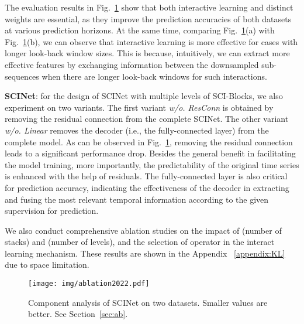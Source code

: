 \documentclass{article}
\begin{document}
The evaluation results in Fig.~\ref{fig:ab} show that both interactive learning and distinct weights are essential, as they improve the prediction accuracies of both datasets at various prediction horizons. At the same time, comparing Fig.~\ref{fig:ab}(a) with Fig.~\ref{fig:ab}(b), we can observe that interactive learning is more effective for cases with longer look-back window sizes. This is because, intuitively, we can extract more effective features by exchanging information between the downsampled sub-sequences when there are longer look-back windows for such interactions.


\vspace{5pt}
\textbf{SCINet}: for the design of SCINet with multiple levels of SCI-Blocks, we also experiment on two variants.
The first variant \emph{w/o. ResConn} is obtained by removing the residual connection from the complete SCINet. 
The other variant \emph{w/o. Linear} removes the decoder (i.e., the fully-connected layer) from the complete model. 
As can be observed in Fig.~\ref{fig:ab}, removing the residual connection leads to a significant performance drop. Besides the general benefit in facilitating the model training, more importantly, the predictability of the original time series is enhanced with the help of residuals.
The fully-connected layer is also critical for prediction accuracy, indicating the effectiveness of the decoder in extracting and fusing the most relevant temporal information according to the given supervision for prediction.

We also conduct comprehensive ablation studies on the impact of  (number of stacks) and  (number of levels), and the selection of operator in the interact learning mechanism. These results are shown in the Appendix ~\ref{appendix:KL} due to space limitation. 


\begin{figure}[t]	
\centering
\texttt{[image: img/ablation2022.pdf]}
\caption{Component analysis of SCINet on two datasets. Smaller values are better. See Section~\ref{sec:ab}.}
\label{fig:ab}
\end{figure}
\end{document}
